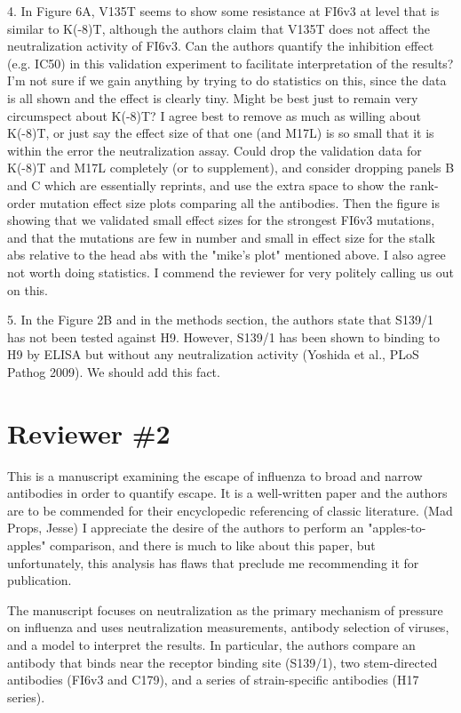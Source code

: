 \documentclass[11pt, oneside]{article}   	%
\begin{document}
4. In Figure 6A, V135T seems to show some resistance at FI6v3 at level that is similar to K(-8)T, although the authors claim that V135T does not affect the neutralization activity of FI6v3. Can the authors quantify the inhibition effect (e.g. IC50) in this validation experiment to facilitate interpretation of the results?
{\color{red} I'm not sure if we gain anything by trying to do statistics on this, since the data is all shown and the effect is clearly tiny. 
Might be best just to remain very circumspect about K(-8)T?}
{\color{blue} I agree best to remove as much as willing about K(-8)T, or just say the effect size of that one (and M17L) is so small that it is within the error the neutralization assay. Could drop the validation data for K(-8)T and M17L completely (or to supplement), and consider dropping panels B and C which are essentially reprints, and use the extra space to show the rank-order mutation effect size plots comparing all the antibodies. Then the figure is showing that we validated small effect sizes for the strongest FI6v3 mutations, and that the mutations are few in number and small in effect size for the stalk abs relative to the head abs with the "mike's plot" mentioned above.
I also agree not worth doing statistics. I commend the reviewer for very politely calling us out on this.}

5. In the Figure 2B and in the methods section, the authors state that S139/1 has not been tested against H9. However, S139/1 has been shown to binding to H9 by ELISA but without any neutralization activity (Yoshida et al., PLoS Pathog 2009).
{\color{red} We should add this fact.}

\section*{Reviewer \#2} 
This is a manuscript examining the escape of influenza to broad and narrow antibodies in order to quantify escape. It is a well-written paper and the authors are to be commended for their encyclopedic referencing of classic literature. {\color{blue} (Mad Props, Jesse)} I appreciate the desire of the authors to perform an "apples-to-apples" comparison, and there is much to like about this paper, but unfortunately, this analysis has flaws that preclude me recommending it for publication.

The manuscript focuses on neutralization as the primary mechanism of pressure on influenza and uses neutralization measurements, antibody selection of viruses, and a model to interpret the results. In particular, the authors compare an antibody that binds near the receptor binding site (S139/1), two stem-directed antibodies (FI6v3 and C179), and a series of strain-specific antibodies (H17 series).
\end{document}
